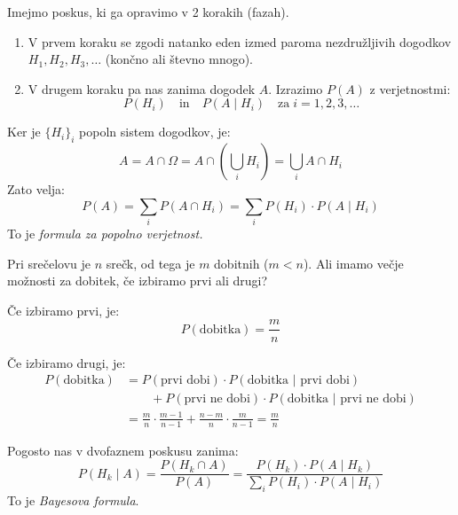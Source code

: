 \documentclass[12pt]{book}
\def\n{\noindent}
\theoremstyle{definition}
\theoremstyle{plain}
\theoremstyle{plain}
\theoremstyle{plain}
\theoremstyle{remark}
\begin{document}
\n Imejmo poskus, ki ga opravimo v 2 korakih (fazah). 

\begin{enumerate}
    \item V prvem koraku se zgodi natanko eden izmed paroma nezdružljivih dogodkov $H_1, H_2, H_3, \ldots $ (končno ali števno mnogo). 
    \item V drugem koraku pa nas zanima dogodek $A$. Izrazimo $P(A)$ z verjetnostmi: $$P\left(H_i\right) \quad \text{in} \quad P\left(A \mid H_i\right) \quad \text{za} \; i= 1, 2, 3, \ldots $$
\end{enumerate}

\n Ker je $\{ H_i \}_i$ popoln sistem dogodkov, je:
$$
A=A \cap \Omega=A \cap\left(\bigcup_i H_i\right)=\bigcup_i A \cap H_i
$$
Zato velja:
$$
P(A)=\sum_i P\left(A \cap H_i\right)=\sum_i P\left(H_i\right) \cdot P(A \mid H_i)
$$
To je \emph{formula za popolno verjetnost.}

\begin{zgled}
    Pri srečelovu je $n$ srečk, od tega je $m$ dobitnih ($m<n$). Ali imamo večje možnosti za dobitek, če izbiramo prvi ali drugi?

    Če izbiramo prvi, je:
    $$
    P(\text{dobitka}) = \frac{m}{n}
    $$

    Če izbiramo drugi, je:
    $$
    \begin{aligned}
        P(\text{dobitka}) &= P(\text{prvi dobi}) \cdot P(\text{dobitka | prvi dobi}) \\
        & \qquad + P(\text{prvi ne dobi}) \cdot P(\text{dobitka | prvi ne dobi}) \\
        &= \frac{m}{n} \cdot \frac{m-1}{n-1}+\frac{n-m}{n} \cdot \frac{m}{n-1} =\frac{m}{n}
    \end{aligned}
    $$
\end{zgled}

\n Pogosto nas v dvofaznem poskusu  zanima: 
$$
P\left(H_k \mid A\right)=\frac{P\left(H_k \cap A\right)}{P(A)}=\frac{P\left(H_k\right) \cdot P\left(A \mid H_k\right)}{\sum_i P\left(H_i\right) \cdot P\left(A \mid H_i\right)}
$$
To je \emph{Bayesova formula}.
\end{document}
